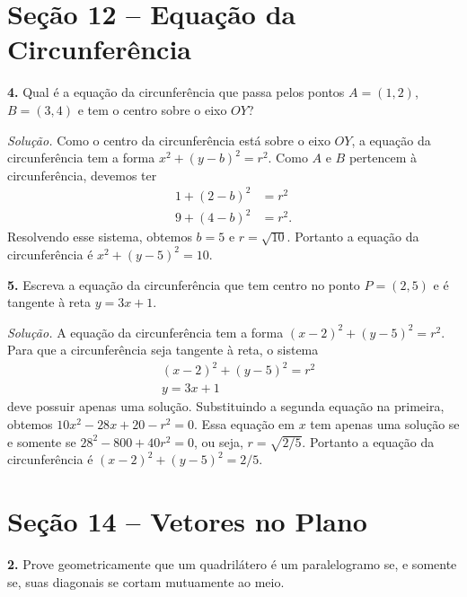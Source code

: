 \documentclass[a4paper,11pt]{article}
\begin{document}
\section*{Seção 12 -- Equação da Circunferência}

\textbf{4.}
Qual é a equação da circunferência que passa pelos pontos $A = (1,2)$, $B = (3,4)$ e tem o centro sobre o eixo $OY$?

\vspace{\baselineskip}

\emph{Solução.}
Como o centro da circunferência está sobre o eixo $OY$, a equação da circunferência tem a forma $x^2 + (y-b)^2 = r^2$.
Como $A$ e $B$ pertencem à circunferência, devemos ter
\begin{align*}
  1 + (2 - b)^2 & = r^2 \\
  9 + (4 - b)^2 & = r^2.
\end{align*}
Resolvendo esse sistema, obtemos $b = 5$ e $r = \sqrt{10}$.
Portanto a equação da circunferência é $x^2 + (y - 5)^2 = 10$.

\vspace{\baselineskip}

\textbf{5.}
Escreva a equação da circunferência que tem centro no ponto $P = (2,5)$ e é tangente à reta $y = 3x + 1$.

\vspace{\baselineskip}

\emph{Solução.}
A equação da circunferência tem a forma $(x-2)^2 + (y-5)^2 = r^2$.
Para que a circunferência seja tangente à reta, o sistema
\begin{align*}
  & (x-2)^2 + (y-5)^2 = r^2 \\
  & y = 3x + 1
\end{align*}
deve possuir apenas uma solução.
Substituindo a segunda equação na primeira, obtemos $10x^2 - 28x + 20-r^2 = 0$.
Essa equação em $x$ tem apenas uma solução se e somente se $28^2 - 800 + 40r^2 = 0$, ou seja, $r = \sqrt{2/5}$.
Portanto a equação da circunferência é $(x-2)^2 + (y-5)^2 = 2/5$.

\section*{Seção 14 -- Vetores no Plano}

\textbf{2.}
Prove geometricamente que um quadrilátero é um paralelogramo se, e somente se, suas diagonais se cortam mutuamente ao meio.

\vspace{\baselineskip}
\end{document}
